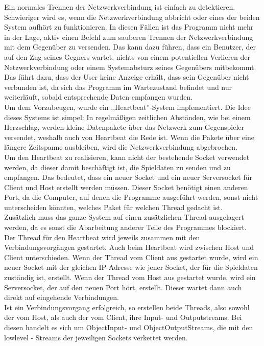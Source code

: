 \documentclass[12pt,a4paper]{article}
\begin{document}
Ein normales Trennen der Netzwerkverbindung ist einfach zu detektieren. Schwieriger wird es, wenn die Netzwerkverbindung abbricht oder eines der beiden System aufhört zu funktionieren. In diesen Fällen ist das Programm nicht mehr in der Lage, aktiv einen Befehl zum sauberen Trennen der Netzwerkverbindung mit dem Gegenüber zu versenden. Das kann dazu führen, dass ein Benutzer, der auf den Zug seines Gegners wartet, nichts von einem potentiellen Verlieren der Netzwerkverbindung oder einem Systemabsturz seines Gegenübers mitbekommt. Das führt  dazu, dass der User keine Anzeige erhält, dass sein Gegenüber nicht verbunden ist, da sich das Programm im Wartezustand befindet und nur weiterläuft, sobald entsprechende Daten empfangen wurden.\\
Um dem Vorzubeugen, wurde ein ,,Heartbeat''-System implementiert. Die Idee dieses Systems ist simpel: In regelmäßigen zeitlichen Abständen, wie bei einem Herzschlag, werden kleine Datenpakete über das Netzwerk zum Gegenspieler versendet, weshalb auch von Heartbeat die Rede ist. Wenn die Pakete über eine längere Zeitspanne ausbleiben, wird die Netzwerkverbindung abgebrochen.\\[3ex]
Um den Heartbeat zu realisieren, kann nicht der bestehende Socket verwendet werden, da dieser damit beschäftigt ist, die Spieldaten zu senden und zu empfangen. Das bedeutet, dass ein neuer Socket und ein neuer Serversocket für Client und Host erstellt werden müssen. Dieser Socket benötigt einen anderen Port, da die Computer, auf denen die Programme ausgeführt werden, sonst nicht unterscheiden könnten, welches Paket für welchen Thread gedacht ist.\\ Zusätzlich muss das ganze System auf einen zusätzlichen Thread ausgelagert werden, da es sonst die Abarbeitung anderer Teile des Programmes blockiert. \\
Der Thread für den Heartbeat wird jeweils zusammen mit den Verbindungsvorgängen gestartet. Auch beim Heartbeat wird zwischen Host und Client unterschieden. 
Wenn der Thread vom Client aus gestartet wurde, wird ein neuer Socket mit der gleichen IP-Adresse wie jener Socket, der für die Spieldaten zuständig ist, erstellt. Wenn der Thread vom Host aus gestartet wurde, wird ein Serversocket, der auf den neuen Port hört, erstellt. Dieser wartet dann auch direkt auf eingehende Verbindungen. \\
Ist ein Verbindungsvorgang erfolgreich, so erstellen beide Threads, also sowohl der vom Host, als auch der vom Client, ihre Input- und Outputstreams. Bei diesen handelt es sich um ObjectInput- und ObjectOutputStreams, die mit den lowlevel - Streams der jeweiligen Sockets verkettet werden. \\
\end{document}

